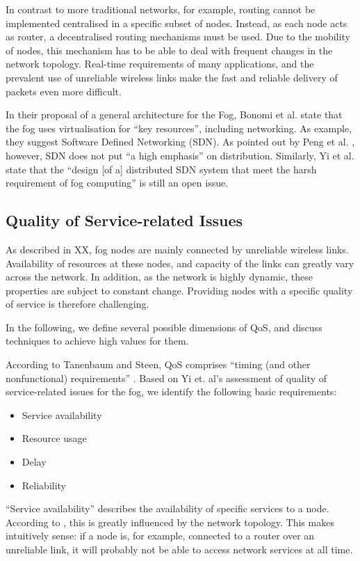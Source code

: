 \documentclass{article}
\begin{document}
In contrast to more traditional networks, for example, routing cannot be implemented centralised in a specific subset of nodes. Instead, as each node acts as router, a decentralised routing mechanisms must be used. Due to the mobility of nodes, this mechanism has to be able to deal with frequent changes in the network topology. Real-time requirements of many applications, and the prevalent use of unreliable wireless links make the fast and reliable delivery of packets even more difficult.

In their proposal of a general architecture for the Fog, Bonomi et al. \cite{bonomi2014fog} state that the fog uses virtualisation for ``key resources'', including networking. As example, they suggest Software Defined Networking (SDN). As pointed out by Peng et al. \cite{peng2016fog}, however, SDN does not put ``a high emphasis'' on distribution. Similarly, Yi et al. state that the ``design [of a] distributed SDN system that meet the harsh requirement of fog computing'' is still an open issue.


\subsection{Quality of Service-related Issues}
\label{sub_issues_qos}
As described in XX, fog nodes are mainly connected by unreliable wireless links. Availability of resources at these nodes, and capacity of the links can greatly vary across the network. In addition, as the network is highly dynamic, these properties are subject to constant change. Providing nodes with a specific quality of service is therefore challenging.

In the following, we define several possible dimensions of QoS, and discuss techniques to achieve high values for them.

According to Tanenbaum and Steen, QoS comprises ``timing (and other nonfunctional) requirements'' \cite{tanebaum2013}. Based on Yi et. al's assessment of quality of service-related issues for the fog, we identify the following basic requirements:

\begin{itemize}
	\item Service availability
	\item Resource usage
	\item Delay
	\item Reliability
\end{itemize}

``Service availability'' describes the availability of specific services to a node. According to \cite{yi2015survey}, this is greatly influenced by the network topology. This makes intuitively sense: if a node is, for example, connected to a router over an unreliable link, it will probably not be able to access network services at all time.
\end{document}
